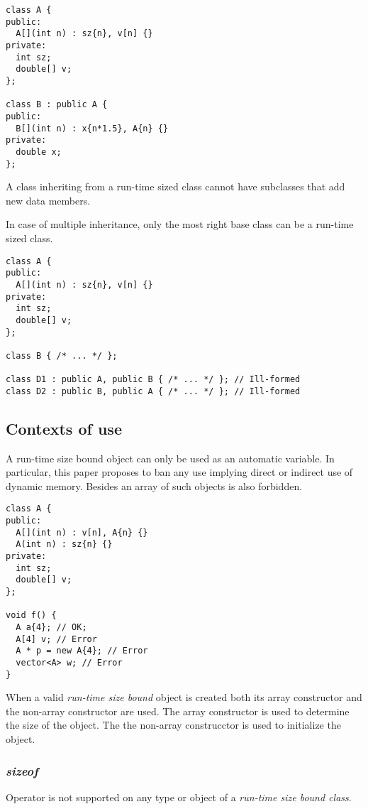 \begin{lstlisting}
class A {
public:
  A[](int n) : sz{n}, v[n] {}
private:
  int sz;
  double[] v;
};

class B : public A {
public:
  B[](int n) : x{n*1.5}, A{n} {}
private:
  double x;
};
\end{lstlisting}

A class inheriting from a run-time sized class cannot have subclasses that add new data members.

In case of multiple inheritance, only the most right base class can be a run-time sized class.

\begin{lstlisting}
class A {
public:
  A[](int n) : sz{n}, v[n] {}
private:
  int sz;
  double[] v;
};

class B { /* ... */ };

class D1 : public A, public B { /* ... */ }; // Ill-formed
class D2 : public B, public A { /* ... */ }; // Ill-formed
\end{lstlisting}

\subsection{Contexts of use}

A run-time size bound object can only be used as an automatic variable.
In particular, this paper proposes to ban any use implying direct or indirect
use of dynamic memory. Besides an array of such objects is also forbidden.

\begin{lstlisting}
class A {
public:
  A[](int n) : v[n], A{n} {}
  A(int n) : sz{n} {}
private:
  int sz;
  double[] v;
};

void f() {
  A a{4}; // OK;
  A[4] v; // Error
  A * p = new A{4}; // Error
  vector<A> w; // Error
}
\end{lstlisting}

When a valid \emph{run-time size bound} object is created both its array constructor
and the non-array constructor are used. The array constructor is used to determine the
size of the object. The the non-array construcctor is used to initialize the object.

\subsubsection{\emph{sizeof}}

Operator  is not supported on any type or object of a \emph{run-time size bound class}.

